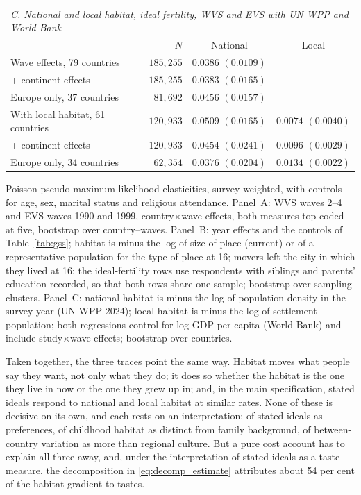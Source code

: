 \documentclass[11pt]{article}
\begin{document}
\begin{table}[h!]
\begin{threeparttable}
\begin{tabular}{lrcc}
\midrule
\multicolumn{4}{l}{\emph{C. National and local habitat, ideal fertility, WVS and EVS with UN WPP and World Bank}}\\
& $N$ & National & Local\\
\midrule
Wave effects, 79 countries                & $185{,}255$ & $0.0386$ $(0.0109)$ & \\
\quad + continent effects                 & $185{,}255$ & $0.0383$ $(0.0165)$ & \\
\quad Europe only, 37 countries           & $81{,}692$  & $0.0456$ $(0.0157)$ & \\
With local habitat, 61 countries          & $120{,}933$ & $0.0509$ $(0.0165)$ & $0.0074$ $(0.0040)$\\
\quad + continent effects                 & $120{,}933$ & $0.0454$ $(0.0241)$ & $0.0096$ $(0.0029)$\\
\quad Europe only, 34 countries           & $62{,}354$  & $0.0376$ $(0.0204)$ & $0.0134$ $(0.0022)$\\
\bottomrule
\end{tabular}
\begin{tablenotes}\footnotesize
\item Poisson pseudo-maximum-likelihood elasticities, survey-weighted, with controls for age, sex,
marital status and religious attendance. Panel~A: WVS waves 2--4 and EVS waves 1990 and 1999,
country$\times$wave effects, both measures top-coded at five, bootstrap over country--waves. Panel~B: year effects and the controls of
Table~\ref{tab:gss}; habitat is minus the log of size of place (current) or of a representative
population for the type of place at 16; movers left the city in which they lived at 16; the
ideal-fertility rows use respondents with siblings and parents' education recorded, so that both rows
share one sample; bootstrap over sampling clusters. Panel~C: national habitat is minus the log of population density in the
survey year (UN WPP 2024); local habitat is minus the log of settlement population; both
regressions control for log GDP per capita (World Bank) and include study$\times$wave effects;
bootstrap over countries.
\end{tablenotes}
\end{threeparttable}
\end{table}

Taken together, the three traces point the same way. Habitat moves what people say they want, not
only what they do; it does so whether the habitat is the one they live in now or the one they grew
up in; and, in the main specification, stated ideals respond to national and local habitat at
similar rates. None of these is
decisive on its own, and each rests on an interpretation: of stated ideals as preferences, of
childhood habitat as distinct from family background, of between-country variation as more than
regional culture. But a pure cost account has to explain all three away, and, under the interpretation of stated ideals as a taste measure, the decomposition in
\eqref{eq:decomp_estimate} attributes about 54 per cent of the habitat gradient to tastes.
\end{document}
